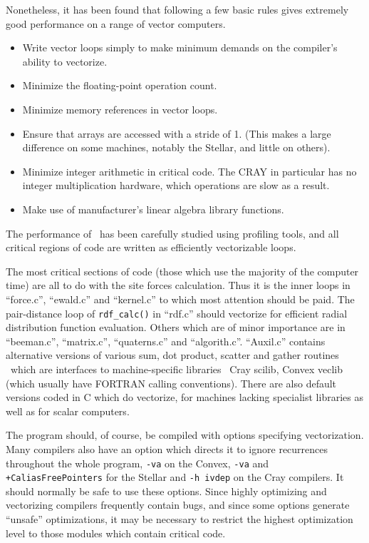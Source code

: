 Nonetheless, it has been found that following a few basic rules gives
extremely good performance on a range of vector computers.
\begin{itemize}
\item Write vector loops simply to make minimum demands on the
compiler's ability to vectorize.
\item Minimize the floating-point operation count.
\item Minimize memory references in vector loops.
\item Ensure that arrays are accessed with a stride of 1.  (This makes
a large difference on some machines, notably the Stellar, and little
on others). 
\item Minimize integer arithmetic in critical code.  The CRAY in
particular has no  integer multiplication hardware, which operations
are slow as a result.
\item Make use of manufacturer's linear algebra library functions.
\end{itemize}
The performance of \moldy\  has been carefully studied using profiling
tools, and all critical regions of code are written as efficiently
vectorizable loops.  

The most critical sections of code (\ie those which use the majority
of the computer time) are all to do with the site forces calculation.
Thus it is the inner loops in ``force.c'', ``ewald.c'' and
``kernel.c'' to which most attention should be paid.  The
pair-distance loop of \verb'rdf_calc()' in ``rdf.c'' should vectorize
for efficient radial distribution function evaluation. Others which
are of minor importance are in ``beeman.c'', ``matrix.c'',
``quaterns.c'' and ``algorith.c''.  ``Auxil.c'' contains alternative
versions of various sum, dot product, scatter and gather routines
\etc\ which are interfaces to machine-specific libraries \eg\
Cray scilib, Convex veclib (which usually have FORTRAN calling
conventions). There are also default versions coded in C which do
vectorize, for machines lacking specialist libraries as well as for
scalar computers.

The program should, of course, be compiled with options specifying
vectorization. Many compilers also have an option which directs it to
ignore recurrences throughout the whole program, \eg \verb'-va' on the
Convex, \verb'-va' and \verb'+CaliasFreePointers' for the Stellar and
\verb'-h ivdep' on the Cray compilers. It should  normally be safe to
use these options.  Since highly optimizing and vectorizing compilers
frequently contain bugs, and since some options generate ``unsafe''
optimizations,  it may be necessary to restrict the highest
optimization level to those modules which contain critical code.


